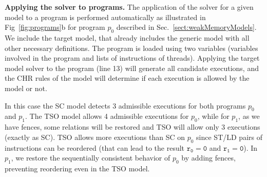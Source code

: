 \medskip\noindent
\textbf{Applying the solver to programs.}
The application of the solver for a given model to a program is 
performed automatically as illustrated in 
Fig~\ref{fig:programs}b for program $p_0$ described in 
Sec.~\ref{sect:weakMemoryModels}. 
%
%
%
We include the target model, that already includes 
the generic model with all other necessary definitions.
The program is loaded using two variables
(variables involved in the program and lists of instructions of threads).
Applying the target model solver to the program (line 13)  will generate all candidate
executions, and the CHR rules of the model will determine if each
execution is allowed by the model or not.

In this case the SC model detects 3 admissible
executions for both programs $p_0$ and $p_1$.
The TSO model allows 4 admissible executions for  $p_0$,
while for  $p_1$, as we have fences, some relations will
be restored and TSO will allow only 3 executions (exactly as SC).
TSO allows more executions than 
SC on $p_0$ since ST/LD pairs of instructions can be reordered
(that can lead to the result $\mathtt{r_0 = 0}$ and $\mathtt{r_1 = 0}$).
In $p_1$, we restore the sequentially consistent behavior of $p_0$ by adding fences, 
preventing reordering even in the TSO model.

